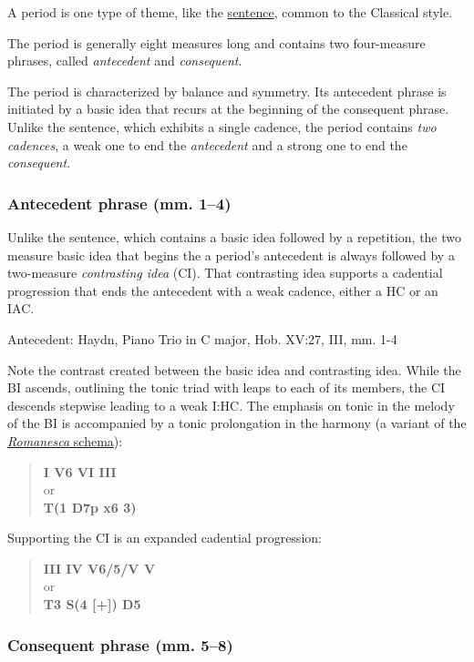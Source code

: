 \documentclass{book}
\begin{document}
A period is one type of theme, like the \href{sentence.html}{sentence}, common
to the Classical style.

The period is generally eight measures long and contains two four-measure
phrases, called \emph{antecedent} and \emph{consequent}.

The period is characterized by balance and symmetry. Its antecedent phrase is
initiated by a basic idea that recurs at the beginning of the consequent
phrase. Unlike the sentence, which exhibits a single cadence, the period
contains \emph{two cadences}, a weak one to end the \emph{antecedent} and a
strong one to end the \emph{consequent}.

\hypertarget{antecedent-phrase-mm.-14}{%
\subsubsection{Antecedent phrase (mm. 1--4)}\label{antecedent-phrase-mm.-14}}

Unlike the sentence, which contains a basic idea followed by a repetition, the
two measure basic idea that begins the a period's antecedent is always
followed by a two-measure \emph{contrasting idea} (CI). That contrasting idea
supports a cadential progression that ends the antecedent with a weak cadence,
either a HC or an IAC.

Antecedent: Haydn, Piano Trio in C major, Hob. XV:27, III, mm. 1-4

Note the contrast created between the basic idea and contrasting idea. While
the BI ascends, outlining the tonic triad with leaps to each of its members,
the CI descends stepwise leading to a weak I:HC. The emphasis on tonic in the
melody of the BI is accompanied by a tonic prolongation in the harmony (a
variant of the \href{schemataOpensAndCloses.html}{\emph{Romanesca} schema}):

\begin{quote}
\textbf{I V6 VI III}\\
or\\
\textbf{T(1 D7p x6 3)}
\end{quote}

Supporting the CI is an expanded cadential progression:

\begin{quote}
\textbf{III IV V6/5/V V}\\
or\\
\textbf{T3 S(4 {[}+{]}) D5}
\end{quote}

\hypertarget{consequent-phrase-mm.-58}{%
\subsubsection{Consequent phrase (mm. 5--8)}\label{consequent-phrase-mm.-58}}
\end{document}
